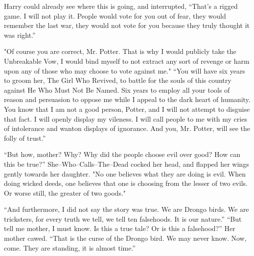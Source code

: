 Harry could already see where this is going, and interrupted, “That’s a rigged game. I will not play it. People would vote for you out of fear, they would remember the last war, they would not vote for you because they truly thought it was right.”

"Of course you are correct, Mr. Potter. That is why I would publicly take the Unbreakable Vow, I would bind myself to not extract any sort of revenge or harm upon any of those who may choose to vote against me."
\SomeVSpace
“You will have six years to groom her, The Girl Who Revived, to battle for the souls of this country against He Who Must Not Be Named. Six years to employ all your tools of reason and persuasion to oppose me while I appeal to the dark heart of humanity. You know that I am not a good person, Potter, and I will not attempt to disguise that fact. I will openly display my vileness. I will call people to me with my cries of intolerance and wanton displays of ignorance. And you, Mr. Potter, will see the folly of trust.”
\simpleline
{}

“But how, mother? Why? Why did the people choose evil over good? How can this be true?”
\SmallVSpace
She\mbox{--}Who\mbox{--}Calls\mbox{--}The\mbox{--}Dead cocked her head, and flapped her wings gently towards her daughter. "No one believes what they are doing is evil. When doing wicked deeds, one believes that one is choosing from the lesser of two evils. Or worse still, the greater of two goods."

“And furthermore, I did not say the story was true. We are Drongo birds. We are tricksters, for every truth we tell, we tell ten falsehoods. It is our nature.”
\SmallVSpace
“But tell me mother, I must know. Is this a true tale? Or is this a falsehood?”
\SmallVSpace
Her mother cawed. “That is the curse of the Drongo bird. We may never know. Now, come. They are standing, it is almost time.”